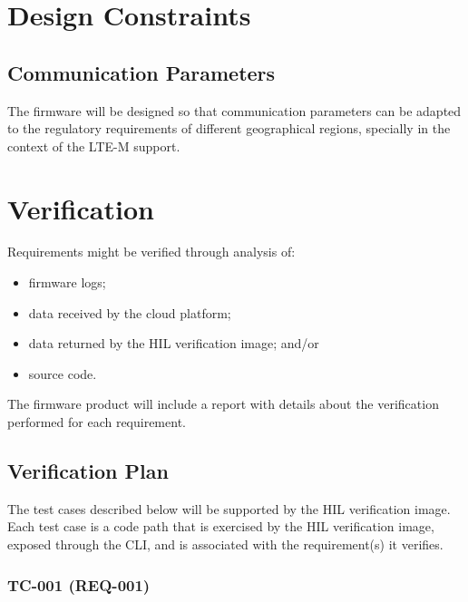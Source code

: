 \documentclass[11pt,a4paper]{article}
\begin{document}
\section{Design Constraints}

\subsection{Communication Parameters}

The firmware will be designed so that communication parameters can be adapted
to the regulatory requirements of different geographical regions, specially in
the context of the LTE-M support.

\section{Verification}

Requirements might be verified through analysis of:

\begin{itemize}
    \item firmware logs;
    \item data received by the cloud platform;
    \item data returned by the HIL verification image; and/or
    \item source code.
\end{itemize}

The firmware product will include a report with details about the verification
performed for each requirement.

\subsection{Verification Plan}

The test cases described below will be supported by the HIL verification image.
Each test case is a code path that is exercised by the HIL verification image,
exposed through the CLI, and is associated with the requirement(s) it verifies.

\subsubsection{TC-001 (REQ-001)}
\end{document}
